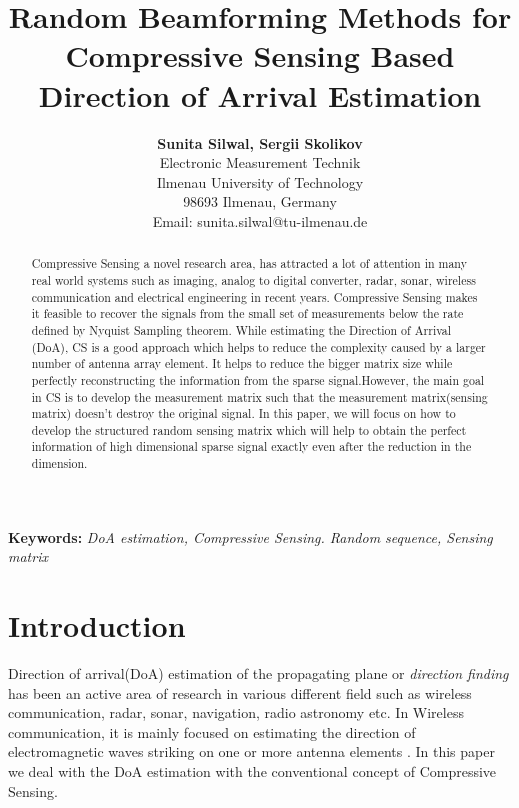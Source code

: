 \documentclass[10pt,conference]{IEEEtran}
\begin{document}
\title{Random Beamforming Methods for Compressive Sensing Based Direction of Arrival Estimation}
\author{\textbf{Sunita Silwal, Sergii Skolikov}\\
Electronic Measurement Technik\\
Ilmenau University of Technology\\                      
98693 Ilmenau, Germany\\
Email: sunita.silwal@tu-ilmenau.de}
\maketitle
\begin{abstract}
Compressive Sensing  a novel research area, has attracted a lot of attention in many real world systems such as imaging, analog to digital converter, radar, sonar, wireless communication  and electrical engineering in recent years. Compressive Sensing makes it feasible to recover the signals from the small set of measurements below the rate defined by Nyquist Sampling theorem. While estimating the Direction of Arrival (DoA), CS is a good approach which helps to reduce the complexity caused by a larger number of antenna array element. It helps to reduce the bigger matrix size while perfectly reconstructing the information from the sparse signal.However, the main goal in CS is to develop the measurement matrix such that the measurement matrix(sensing matrix) doesn't destroy the original signal.  In this paper, we will focus on how to develop the structured random sensing matrix which will help to obtain the perfect information of high dimensional sparse signal exactly even after the reduction in the dimension. 


	
\end{abstract}


\textbf{Keywords:} \textit{DoA estimation, Compressive Sensing. Random sequence, Sensing matrix}
\section{Introduction}
Direction of arrival(DoA) estimation of the propagating plane or \textit{direction finding} has been an active area of research in various different field such as wireless communication, radar, sonar, navigation, radio astronomy etc. In Wireless communication, it is mainly focused on estimating the direction of electromagnetic waves striking on one or more antenna elements \cite{tuncer2009classical}. In this paper we deal with the DoA estimation with the conventional concept of Compressive Sensing. 
\end{document}
